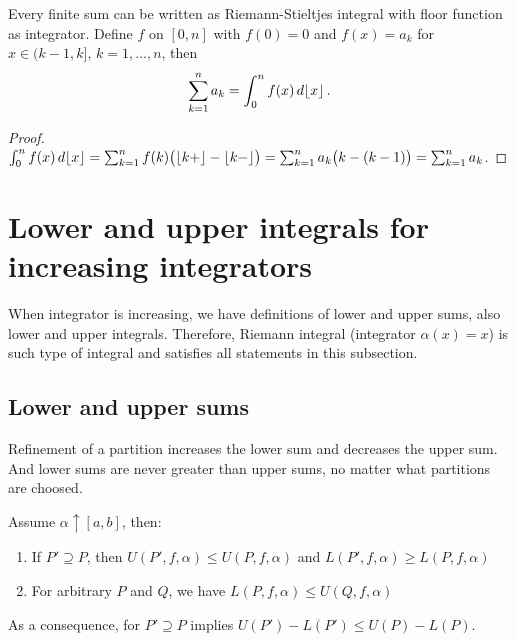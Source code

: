 \documentclass{article}
\DeclarePairedDelimiter\floor{\lfloor}{\rfloor}
\newcommand{\finer}{\supseteq}
\newcommand{\dd}{\mathop{}\!d}
\newcommand{\increasing}{\uparrow}
\begin{document}
\begin{theorem}
    Every finite sum can be written as Riemann-Stieltjes integral with floor function as integrator. Define $ f $ on $ [0, n] $ with $ f(0) = 0 $ and $ f(x) = a_k $ for $ x \in (k - 1, k] $, $ k = 1, \dots, n $, then
    \[ 
        \sum_{k=1}^{n} a_k = \int_0^n f(x) \dd \floor{x} \,.
    \]
\end{theorem}

\begin{proof}
    $ \int_0^n f(x) \dd \floor{x} = \sum_{k=1}^{n} f(k) \big( \floor{k+} - \floor{k-} \big) = \sum_{k=1}^{n} a_k \big( k - (k - 1) \big) = \sum_{k=1}^{n} a_k $.
\end{proof}

\section{Lower and upper integrals for increasing integrators}
When integrator is increasing, we have definitions of lower and upper sums, also lower and upper integrals. Therefore, Riemann integral (integrator $ \alpha(x) = x $) is such type of integral and satisfies all statements in this subsection.

\subsection{Lower and upper sums}
Refinement of a partition increases the lower sum and decreases the upper sum. And lower sums are never greater than upper sums, no matter what partitions are choosed.

\begin{theorem}    \label{thm:lower-upper-sum}
    Assume $ \alpha \increasing [a, b] $, then:
    \begin{enumerate}
        \item If $ P' \finer P $, then $ U(P', f, \alpha) \leqslant U(P, f, \alpha) $ and $ L(P', f, \alpha) \geqslant L(P, f, \alpha) $
        \item For arbitrary $ P $ and $ Q $, we have $ L(P, f, \alpha) \leqslant U(Q, f, \alpha) $
    \end{enumerate}
\end{theorem}

As a consequence, for $ P' \finer P $ implies $ U(P') - L(P') \leqslant U(P) - L(P) $.
\end{document}
